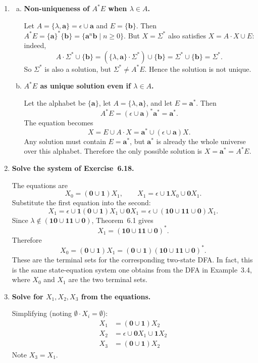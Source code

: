\begin{enumerate}[{6.}1.]
\item \begin{enumerate}[(a)]
  \item \textbf{Non-uniqueness of $A^*E$ when $\lambda\in A$.}

  Let $A=\{\lambda,\pmb{a}\}=\epsilon\cup\pmb{a}$ and $E=\{\pmb{b}\}$.
  Then $A^*E=\{\pmb{a}\}^*\{\pmb{b}\}=\{\pmb{a}^n\pmb{b}\mid n\ge 0\}$.
  But $X=\Sigma^*$ also satisfies $X=A\cdot X\cup E$: indeed,
  \[
    A\cdot\Sigma^*\cup\{\pmb{b}\}
    =(\{\lambda,\pmb{a}\}\cdot\Sigma^*)\cup\{\pmb{b}\}
    =\Sigma^*\cup\{\pmb{b}\}
    =\Sigma^*.
  \]
  So $\Sigma^*$ is also a solution, but $\Sigma^*\neq A^*E$.  Hence the solution is not unique.

  \item \textbf{$A^*E$ as unique solution even if $\lambda\in A$.}

  Let the alphabet be $\{\pmb{a}\}$, let $A=\{\lambda,\pmb{a}\}$, and let
  $E=\pmb{a}^*$.  Then
  \[
    A^*E=(\epsilon\cup\pmb{a})^*\pmb{a}^*=\pmb{a}^*.
  \]
  The equation becomes
  \[
    X=E\cup A\cdot X=\pmb{a}^*\cup(\epsilon\cup\pmb{a})X.
  \]
  Any solution must contain $E=\pmb{a}^*$, but $\pmb{a}^*$ is already the whole
  universe over this alphabet.  Therefore the only possible solution is
  $X=\pmb{a}^*=A^*E$.
\end{enumerate}

\item \textbf{Solve the system of Exercise~6.18.}

The equations are
\[
X_0=(\pmb{0}\cup\pmb{1})X_1,
\qquad
X_1=\epsilon\cup\pmb{1}X_0\cup\pmb{0}X_1.
\]
Substitute the first equation into the second:
\[
X_1=\epsilon\cup\pmb{1}(\pmb{0}\cup\pmb{1})X_1\cup\pmb{0}X_1
=\epsilon\cup(\pmb{10}\cup\pmb{11}\cup\pmb{0})X_1.
\]
Since $\lambda\notin(\pmb{10}\cup\pmb{11}\cup\pmb{0})$, Theorem~6.1 gives
\[
X_1=(\pmb{10}\cup\pmb{11}\cup\pmb{0})^*.
\]
Therefore
\[
X_0=(\pmb{0}\cup\pmb{1})X_1
=(\pmb{0}\cup\pmb{1})(\pmb{10}\cup\pmb{11}\cup\pmb{0})^*.
\]
These are the terminal sets for the corresponding two-state DFA.
In fact, this is the same state-equation system one obtains from the DFA in
Example~3.4, where $X_0$ and $X_1$ are the two terminal sets.

\item \textbf{Solve for $X_1,X_2,X_3$ from the equations.}

Simplifying (noting $\emptyset\cdot X_i=\emptyset$):
\begin{align*}
  X_1 &= (\pmb{0}\cup\pmb{1})X_2 \\
  X_2 &= \epsilon\cup\pmb{0}X_1\cup\pmb{1}X_2 \\
  X_3 &= (\pmb{0}\cup\pmb{1})X_2
\end{align*}
Note $X_3=X_1$.


\end{enumerate}
